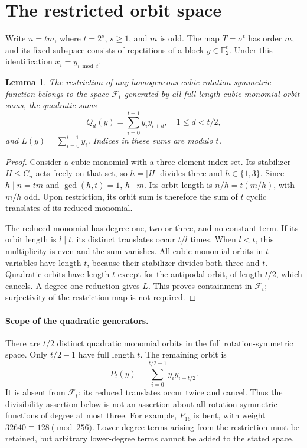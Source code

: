 \documentclass[11pt,a4paper]{article}
\newtheorem{lemma}[theorem]{Lemma}
\newcommand{\F}{\mathbb F_2}
\begin{document}
\appendix
\section{The restricted orbit space}
Write $n=tm$, where $t=2^s$, $s\ge1$, and $m$ is odd. The map $T=\sigma^t$ has order $m$, and its fixed subspace consists of repetitions of a block $y\in\F^t$. Under this identification $x_i=y_{i\bmod t}$.

\begin{lemma}\label{lem:orbit}
The restriction of any homogeneous cubic rotation-symmetric function belongs to the space $\mathcal F_t$ generated by all full-length cubic monomial orbit sums, the quadratic sums
\[Q_d(y)=\sum_{i=0}^{t-1}y_i y_{i+d},\quad 1\le d<t/2,\]
and $L(y)=\sum_{i=0}^{t-1}y_i$. Indices in these sums are modulo $t$.
\end{lemma}
\begin{proof}
Consider a cubic monomial with a three-element index set. Its stabilizer $H\le C_n$ acts freely on that set, so $h=|H|$ divides three and $h\in\{1,3\}$. Since $h\mid n=tm$ and $\gcd(h,t)=1$, $h\mid m$. Its orbit length is $n/h=t(m/h)$, with $m/h$ odd. Upon restriction, its orbit sum is therefore the sum of $t$ cyclic translates of its reduced monomial.

The reduced monomial has degree one, two or three, and no constant term. If its orbit length is $l\mid t$, its distinct translates occur $t/l$ times. When $l<t$, this multiplicity is even and the sum vanishes. All cubic monomial orbits in $t$ variables have length $t$, because their stabilizer divides both three and $t$. Quadratic orbits have length $t$ except for the antipodal orbit, of length $t/2$, which cancels. A degree-one reduction gives $L$. This proves containment in $\mathcal F_t$; surjectivity of the restriction map is not required.
\end{proof}

\paragraph{Scope of the quadratic generators.}
There are $t/2$ distinct quadratic monomial orbits in the full rotation-symmetric space. Only $t/2-1$ have full length $t$. The remaining orbit is
\[
 P_t(y)=\sum_{i=0}^{t/2-1}y_i y_{i+t/2}.
\]
It is absent from $\mathcal F_t$: its reduced translates occur twice and cancel. Thus the divisibility assertion below is not an assertion about all rotation-symmetric functions of degree at most three. For example, $P_{16}$ is bent, with weight $32640\equiv128\pmod{256}$. Lower-degree terms arising from the restriction must be retained, but arbitrary lower-degree terms cannot be added to the stated space.
\end{document}
